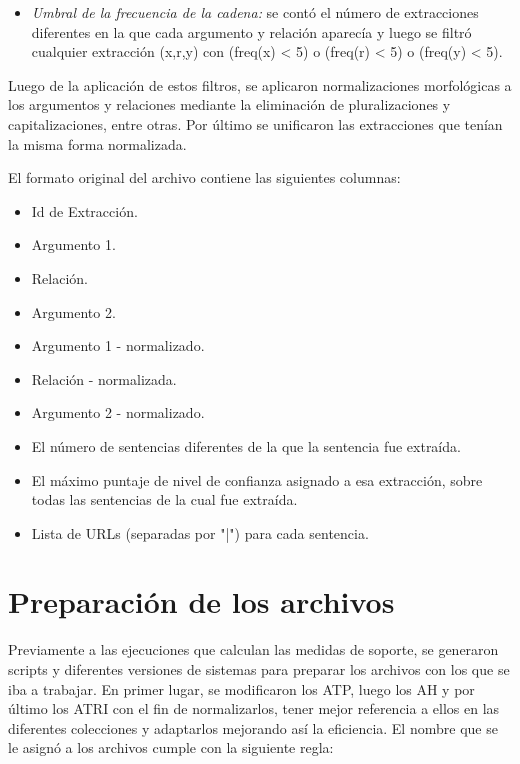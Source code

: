 \begin{itemize}
\begin{itemize}
\item	\emph{Umbral de la frecuencia de la cadena:} se cont\'o el n\'umero de extracciones diferentes en la que cada argumento y relaci\'on aparec\'ia y luego se filtr\'o cualquier extracci\'on (x,r,y) con (freq(x) < 5) o (freq(r) < 5) o (freq(y) < 5).
\end{itemize}

Luego de la aplicaci\'on de estos filtros, se aplicaron normalizaciones morfol\'ogicas a los argumentos y relaciones mediante la eliminaci\'on de pluralizaciones y capitalizaciones, entre otras. Por \'ultimo se unificaron las extracciones que ten\'ian la misma forma normalizada.

El formato original del archivo contiene las siguientes columnas:

\begin{itemize}
\item	Id de Extracci\'on.
\item	Argumento 1.
\item	Relaci\'on.
\item	Argumento 2.
\item	Argumento 1 - normalizado.
\item	Relaci\'on - normalizada.
\item	Argumento 2 - normalizado.
\item	El n\'umero de sentencias diferentes de la que la sentencia fue extra\'ida.
\item	El m\'aximo puntaje de nivel de confianza asignado a esa extracci\'on, sobre todas las sentencias de la cual fue extra\'ida.
\item	Lista de URLs (separadas por "|") para cada sentencia.
\end{itemize}

\end{itemize}

\section{Preparaci\'on de los archivos}
Previamente a las ejecuciones que calculan las medidas de soporte, se generaron scripts y diferentes versiones de sistemas para preparar los archivos con los que se iba a trabajar.
En primer lugar, se modificaron los ATP, luego los AH y por \'ultimo los ATRI con el fin de normalizarlos, tener mejor referencia a ellos en las diferentes colecciones y adaptarlos mejorando as\'i la eficiencia.
El nombre que se le asign\'o a los archivos cumple con la siguiente regla:

